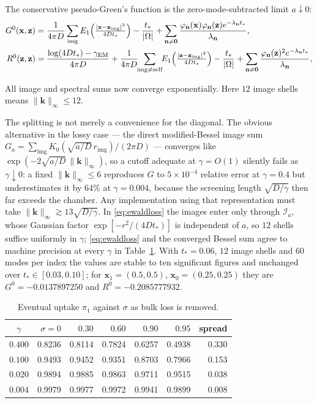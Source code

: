 \documentclass[pdflatex,sn-mathphys-num]{sn-jnl}
\numberwithin{equation}{section}
\theoremstyle{thmstyleone}%
\theoremstyle{definition}
\theoremstyle{remark}
\begin{document}
The conservative pseudo-Green's function is the zero-mode-subtracted limit
$a\downarrow0$:
\begin{align}
G^{0}(\mathbf x,\mathbf z)&=\frac{1}{4\pi D}\sum_{\mathrm{img}}
E_1\Bigl(\tfrac{|\mathbf x-\mathbf z_{\mathrm{img}}|^2}{4Dt_*}\Bigr)
-\frac{t_*}{|\Omega|}
+\sum_{\mathbf n\neq\mathbf 0}\frac{\varphi_{\mathbf n}(\mathbf x)
\varphi_{\mathbf n}(\mathbf z)e^{-\lambda_{\mathbf n}t_*}}{\lambda_{\mathbf n}},
\nonumber\\
R^{0}(\mathbf z,\mathbf z)&=\frac{\log(4Dt_*)-\gamma_{\mathrm{EM}}}{4\pi D}
+\frac{1}{4\pi D}\!\!\sum_{\mathrm{img}\neq\mathrm{self}}\!\!
E_1\Bigl(\tfrac{|\mathbf z-\mathbf z_{\mathrm{img}}|^2}{4Dt_*}\Bigr)
-\frac{t_*}{|\Omega|}
+\sum_{\mathbf n\neq\mathbf 0}\frac{\varphi_{\mathbf n}(\mathbf z)^2
e^{-\lambda_{\mathbf n}t_*}}{\lambda_{\mathbf n}},
\label{eq:ewald}
\end{align}

All image and spectral sums now converge exponentially. Here $12$ image shells means $\|\mathbf k\|_\infty\le12$.

The splitting is not merely a convenience for the diagonal. The obvious alternative in the lossy case --- the direct modified-Bessel image sum $G_a=\sum_{\mathrm{img}}K_0(\sqrt{a/D}\,r_{\mathrm{img}})/(2\pi D)$ --- converges like $\exp(-2\sqrt{a/D}\,\|\mathbf k\|_\infty)$, so a cutoff adequate at $\gamma=O(1)$ silently fails as $\gamma\downarrow0$: a fixed $\|\mathbf k\|_\infty\le6$ reproduces $G$ to $5\times10^{-4}$ relative error at $\gamma=0.4$ but underestimates it by $64\%$ at $\gamma=0.004$, because the screening length $\sqrt{D/\gamma}$ then far exceeds the chamber. Any implementation using that representation must take $\|\mathbf k\|_\infty\gtrsim13\sqrt{D/\gamma}$. In \eqref{eq:ewaldloss} the
images enter only through $\mathcal I_a$, whose Gaussian factor $\exp[-r^2/(4Dt_*)]$ is independent of $a$, so $12$ shells suffice uniformly in $\gamma$; \eqref{eq:ewaldloss} and the converged Bessel sum agree to machine precision at every $\gamma$ in Table~\ref{tab:loss}. With $t_*=0.06$, $12$ image shells and $60$ modes per index the values are stable to ten significant figures and unchanged over $t_*\in[0.03,0.10]$; for $\mathbf x_1=(0.5,0.5)$, $\mathbf x_0=(0.25,0.25)$ they are $G^0=-0.0137897250$ and $R^0=-0.2085777932$.

\begin{table}[htbp]\centering\small
\caption{Eventual uptake $\pi_1$ against $\sigma$ as bulk loss is removed.}
\label{tab:loss}
\begin{tabular}{@{}c|rrrrr|r@{}}
\toprule
$\gamma$&$\sigma=0$&$0.30$&$0.60$&$0.90$&$0.95$&spread\\
\midrule
$0.400$&0.8236&0.8114&0.7824&0.6257&0.4938&0.330\\
$0.100$&0.9493&0.9452&0.9351&0.8703&0.7966&0.153\\
$0.020$&0.9894&0.9885&0.9863&0.9711&0.9515&0.038\\
$0.004$&0.9979&0.9977&0.9972&0.9941&0.9899&0.008\\
\bottomrule
\end{tabular}
\end{table}
\end{document}
